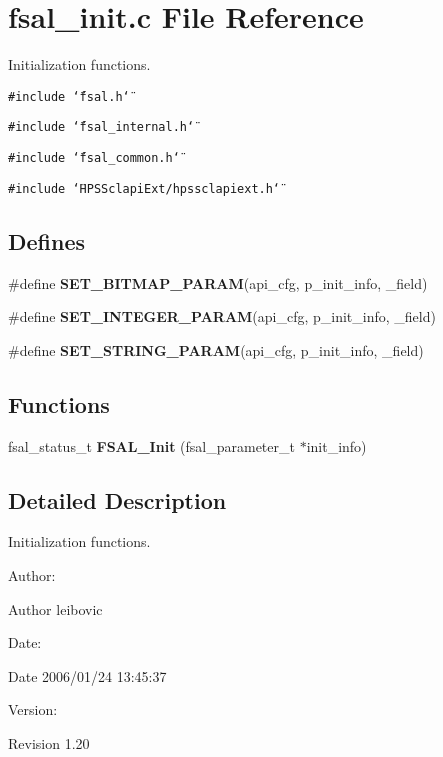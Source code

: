 \section{fsal\_\-init.c File Reference}
\label{fsal__init_8c}
Initialization functions. 

{\tt \#include \char`\"{}fsal.h\char`\"{}}\par
{\tt \#include \char`\"{}fsal\_\-internal.h\char`\"{}}\par
{\tt \#include \char`\"{}fsal\_\-common.h\char`\"{}}\par
{\tt \#include \char`\"{}HPSSclapi\-Ext/hpssclapiext.h\char`\"{}}\par
\subsection*{Defines}
\begin{CompactItemize}
\item 
\#define {\bf SET\_\-BITMAP\_\-PARAM}(api\_\-cfg, p\_\-init\_\-info, \_\-field)
\item 
\#define {\bf SET\_\-INTEGER\_\-PARAM}(api\_\-cfg, p\_\-init\_\-info, \_\-field)
\item 
\#define {\bf SET\_\-STRING\_\-PARAM}(api\_\-cfg, p\_\-init\_\-info, \_\-field)
\end{CompactItemize}
\subsection*{Functions}
\begin{CompactItemize}
\item 
fsal\_\-status\_\-t {\bf FSAL\_\-Init} (fsal\_\-parameter\_\-t $\ast$init\_\-info)
\end{CompactItemize}


\subsection{Detailed Description}
Initialization functions. 

\begin{Desc}
\item[Author:]\begin{Desc}
\item[Author]leibovic \end{Desc}
\end{Desc}
\begin{Desc}
\item[Date:]\begin{Desc}
\item[Date]2006/01/24 13:45:37 \end{Desc}
\end{Desc}
\begin{Desc}
\item[Version:]\begin{Desc}
\item[Revision]1.20 \end{Desc}
\end{Desc}


